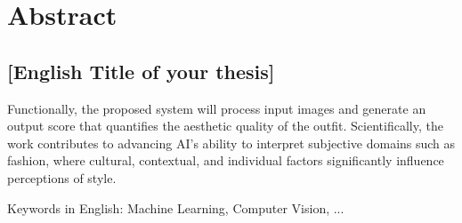 \section*{Abstract}
\subsection*{[English Title of your thesis]}

Functionally, the proposed system will process input images and generate an output score that quantifies the aesthetic quality of the outfit. Scientifically, the work contributes to advancing \acs{AI}'s ability to interpret subjective domains such as fashion, where cultural, contextual, and individual factors significantly influence perceptions of style.

\vspace{0.5cm}

\noindent
Keywords in English: Machine Learning, Computer Vision, ...